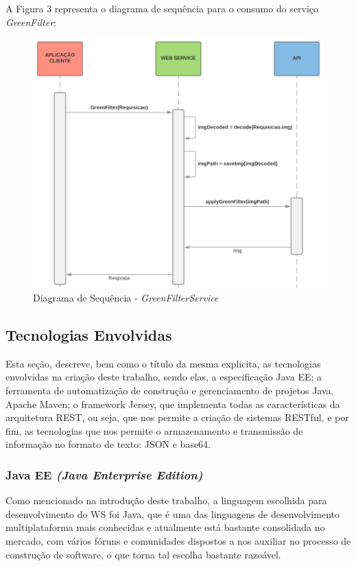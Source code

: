 \documentclass[12pt]{article}
\begin{document}
A Figura 3 representa o diagrama de sequência para o consumo do serviço \textit{GreenFilter}:

\begin{figure}[ht]
	\centering
	\includegraphics[width=.7\textwidth]{ds-green-filter2.png}
	\caption{Diagrama de Sequência - \textit{GreenFilterService}}
	\label{fig:Figura3}
\end{figure}

\subsection{Tecnologias Envolvidas}

Esta seção, descreve, bem como o título da mesma explicita, as tecnologias envolvidas na criação deste trabalho, sendo elas, a especificação Java EE; a ferramenta de automatização de construção e gerenciamento de projetos Java, Apache Maven; o framework Jersey, que implementa todas as características da arquitetura REST, ou seja, que nos permite a criação de sistemas RESTful, e por fim, as tecnologias que nos permite o armazenamento e transmissão de informação no formato de texto: JSON e base64.

\subsubsection{Java EE \textit{(Java Enterprise Edition)}}

Como mencionado na introdução deste trabalho, a linguagem escolhida para desenvolvimento do WS foi Java, que é uma das linguagens de desenvolvimento multiplataforma mais conhecidas e atualmente está bastante consolidada no mercado, com vários fóruns e comunidades dispostos a nos auxiliar no processo de construção de software, o que torna tal escolha bastante razoável. 
\end{document}
